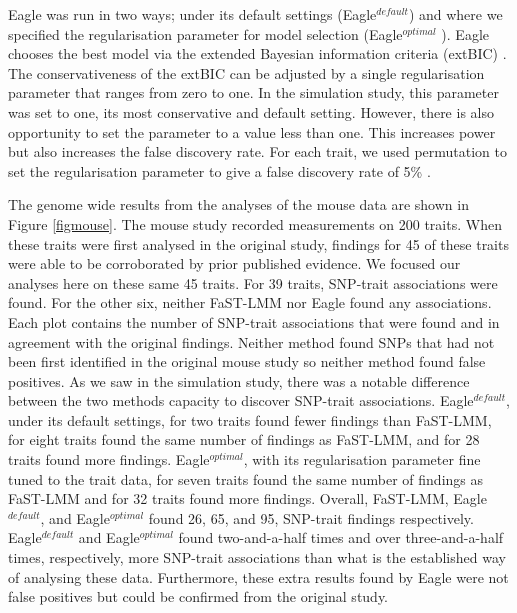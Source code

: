 \documentclass{article}
\begin{document}
Eagle was run in two ways; under its default settings (Eagle$^{default}$) and where we specified the regularisation parameter for model selection (Eagle$^{optimal}$ ). Eagle chooses the best model via the extended Bayesian information criteria (extBIC) \cite{chen2008extended}. 
  The conservativeness of the extBIC can be adjusted by a single regularisation parameter that ranges from zero to one. In the simulation study, this parameter was set to one, its most conservative and default setting. However, there is also opportunity to set the parameter to a value less than one. This increases power but also increases the false discovery rate. For each trait, we used permutation to set the regularisation parameter to give a false discovery rate of 5\% .

The genome wide results from the analyses of the mouse data are shown in Figure  \ref{figmouse}. The mouse study recorded
measurements on 200 traits. When these traits were first analysed in the original study, findings for 45 of these traits were able to be 
corroborated by prior published evidence. We focused our analyses here on these same 45 traits. For 39 traits, SNP-trait associations 
were found. For the other six, neither FaST-LMM nor Eagle found any associations. 
Each plot contains the number of SNP-trait associations that were found and in agreement with the original findings. 
Neither method found SNPs that had not been first identified in the original mouse study so neither method found false positives. 
As we saw in the simulation study, there was a notable difference between the two methods capacity to discover SNP-trait associations. Eagle$^{default}$, under its default settings, for two traits found fewer findings than FaST-LMM, for eight traits found the same number 
of findings as FaST-LMM, and for 28 traits found more findings. Eagle$^{optimal}$, 
with its regularisation parameter fine tuned to the trait data, for seven traits found the same number of findings as FaST-LMM and for 32 traits found more findings. Overall, FaST-LMM, Eagle$^{default}$, and Eagle$^{optimal}$ found 26, 65, and 95, SNP-trait findings respectively. 
Eagle$^{default}$ and Eagle$^{optimal}$ found two-and-a-half times and over three-and-a-half times, respectively, more SNP-trait 
associations than what is the established way of analysing these data. Furthermore, these extra results found by Eagle were not 
false positives but could be confirmed from the original study. 
\end{document}
